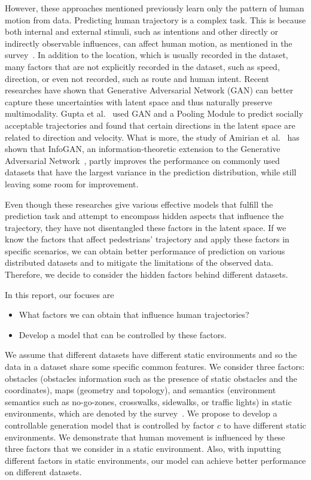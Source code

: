 However, these approaches mentioned previously learn only the pattern of human motion from data. Predicting human trajectory is a complex task. This is because both internal and external stimuli, such as intentions and other directly or indirectly observable influences, can affect human motion, as mentioned in the survey~\cite{humanmotionsurvey}. In addition to the location, which is usually recorded in the dataset, many factors that are not explicitly recorded in the dataset, such as speed, direction, or even not recorded, such as route and human intent. Recent researches have shown that Generative Adversarial Network (GAN) can better capture these uncertainties with latent space and thus naturally preserve multimodality. Gupta et al.~\cite{Gupta_2018_CVPR} used GAN and a Pooling Module to predict socially acceptable trajectories and found that certain directions in the latent space are related to direction and velocity. What is more, the study of Amirian et al.~\cite{Amirian_2019_CVPR_Workshops} has shown that InfoGAN, an information-theoretic extension to the Generative Adversarial Network~\cite{infogan}, partly improves the performance on commonly used datasets that have the largest variance in the prediction distribution, while still leaving some room for improvement.

Even though these researches give various effective models that fulfill the prediction task and attempt to encompass hidden aspects that influence the trajectory, they have not disentangled these factors in the latent space. If we know the factors that affect pedestrians' trajectory and apply these factors in specific scenarios, we can obtain better performance of prediction on various distributed datasets and to mitigate the limitations of the observed data. Therefore, we decide to consider the hidden factors behind different datasets.

In this report, our focuses are
\begin{itemize}
    \item What factors we can obtain that influence human trajectories?
    \item Develop a model that can be controlled by these factors.
\end{itemize} We assume that different datasets have different static environments and so the data in a dataset share some specific common features. We consider three factors: obstacles (obstacles information such as the presence of static obstacles and the coordinates), maps (geometry and topology), and semantics (environment semantics such as no-go-zones, crosswalks, sidewalks, or traffic lights) in static environments, which are denoted by the survey~\cite{humanmotionsurvey}. We propose to develop a controllable generation model that is controlled by factor $c$ to have different static environments. We demonstrate that human movement is influenced by these three factors that we consider in a static environment. Also, with inputting different factors in static environments, our model can achieve better performance on different datasets.